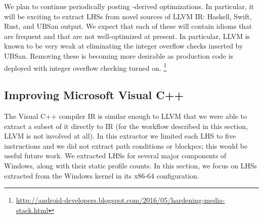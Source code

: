 We plan to continue periodically posting \tool-derived optimizations.
%
In particular, it will be exciting to extract LHSs from novel sources
of LLVM IR: Haskell, Swift, Rust, and UBSan output.
%
We expect that each of these will contain idioms that are frequent and
that are not well-optimized at present.
%
In particular, LLVM is known to be very weak at eliminating the
integer overflow checks inserted by UBSan.
%
Removing these is becoming more desirable as production code is deployed
with integer overflow checking turned on.%
\footnote{\url{http://android-developers.blogspot.com/2016/05/hardening-media-stack.html}}

\subsection{Improving Microsoft Visual C++}

The Visual C++ compiler IR is similar enough to LLVM that we were able
to extract a subset of it directly to \tool{} IR (for the workflow
described in this section, LLVM is not involved at all).
%
In this extractor we limited each LHS to five instructions and we did
not extract path conditions or blockpcs; this would be useful
future work.
%
We extracted LHSs for several major components of Windows, along with
their static profile counts.
%
In this section, we focus on LHSs extracted from the Windows kernel in
its x86-64 configuration.




